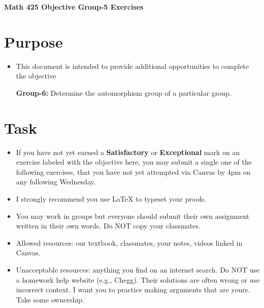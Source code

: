 \documentclass[12pt]{article}
\begin{document}
	\begin{center}
		{\Large \bf Math 425 Objective Group-5 Exercises}
	\end{center}
	\section*{Purpose}
	\begin{itemize}
		\item This document is intended to provide additional opportunities to complete the objective
		
		\textbf{Group-6:}  Determine the automorphism group of a particular group.
	\end{itemize}
	\section*{Task}
	\begin{itemize}
		\item If you have not yet earned a \textbf{Satisfactory} or \textbf{Exceptional} mark on an exercise labeled with the objective here, you may submit a single one of the following exercises, that you have not yet attempted via Canvas by 4pm on any following Wednesday.
		\item I strongly recommend you use LaTeX to typeset your proofs.
		\item You may work in groups but everyone should submit their own assignment written in their own words.  Do NOT copy your classmates.
		\item Allowed resources: our textbook, classmates, your notes, videos linked in Canvas.
		\item Unacceptable resources: anything you find on an internet search. Do NOT use a homework help website (e.g., Chegg). Their solutions are often wrong or use incorrect context.  I want you to practice making arguments that are yours. Take some ownership.
	\end{itemize}
\end{document}
